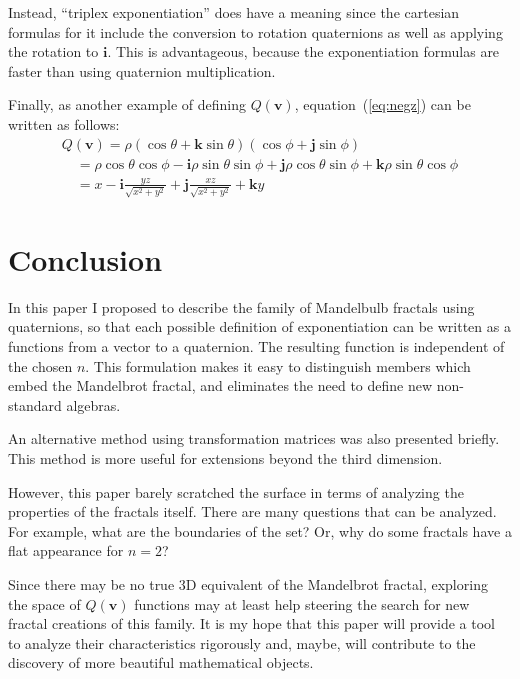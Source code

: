 \documentclass{article}
\let\vec\mathbf
\begin{document}
Instead, ``triplex exponentiation'' does have a meaning since the
cartesian formulas for it include the conversion to rotation
quaternions as well as applying the rotation to $\vec{i}$.  This is
advantageous, because the exponentiation
formulas are faster than using quaternion multiplication.

Finally, as another example of defining $Q(\vec{v})$,
equation~(\ref{eq:negz}) can be written as follows:
\begin{equation*}
  \begin{array}{l}
  Q(\vec{v}) = \rho (\cos \theta + \vec{k} \sin \theta) (\cos \phi + \vec{j} \sin \phi)\\
  \quad = \rho \cos \theta \cos \phi - \vec{i} \rho \sin \theta \sin \phi + \vec{j} \rho \cos \theta \sin \phi + \vec{k} \rho \sin \theta \cos \phi\\
  \quad = x - \vec{i}\frac{y z}{\sqrt{x^2 + y^2}} + \vec{j}\frac{x z}{\sqrt{x^2 + y^2}} + \vec{k} y
  \end{array}
\end{equation*}

\section{Conclusion}

In this paper I proposed to describe the family of Mandelbulb fractals
using quaternions, so that each possible definition of exponentiation
can be written as a functions from a vector to a quaternion.  The
resulting function is independent of the chosen $n$.  This formulation
makes it easy to distinguish members which embed the Mandelbrot
fractal, and eliminates the need to define new non-standard algebras.

An alternative method using transformation matrices was also presented
briefly.  This method is more useful for extensions beyond the third
dimension.

However, this paper barely scratched the surface in terms of analyzing
the properties of the fractals itself.  There are many questions that
can be analyzed.  For example, what are the boundaries of the set?
Or, why do some fractals have a flat appearance for $n = 2$?

Since there may be no true 3D equivalent of the Mandelbrot fractal,
exploring the space of $Q(\vec{v})$ functions may at least help
steering the search for new fractal creations of this family.  It is
my hope that this paper will provide a tool to analyze their
characteristics rigorously and, maybe, will contribute to the
discovery of more beautiful mathematical objects.
\end{document}
